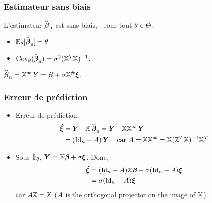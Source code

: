 \begin{frame}
\frametitle{Estimateur sans biais}
\begin{theo}
L'estimateur $\operatorname{\widehat{\boldsymbol{\beta}}_n}$ est sans biais, \ie\ pour tout $\theta \in \Theta$,
\begin{itemize}
\item $\operatorname{{\mathbb E}}_{\theta}[\operatorname{\widehat{\boldsymbol{\beta}}_n}]= \theta$
\item $\mathrm{Cov}_{\theta}(\operatorname{\widehat{\boldsymbol{\beta}}_n})= \sigma^2 (\mathbb{X}^T \mathbb{X})^{-1}$.
\end{itemize}
\end{theo}
\centerline{\alert{$\operatorname{\widehat{\boldsymbol{\beta}}_n} = \mathbb{X}^{\#} \operatorname{\boldsymbol{Y}}= \boldsymbol{\beta} + \sigma \mathbb{X}^{\#} \boldsymbol{\xi}$.}}
\end{frame}

\begin{frame}
\frametitle{Erreur de prédiction}
\begin{itemize}
\item \alert{Erreur de prédiction}:
\begin{align*}
\boldsymbol{\hat{\xi}}
&= \operatorname{\boldsymbol{Y}} - \mathbb{X} \operatorname{\widehat{\boldsymbol{\beta}}_n}= \operatorname{\boldsymbol{Y}} - \mathbb{X} \mathbb{X}^{\#} \operatorname{\boldsymbol{Y}} \\
&= (\mathrm{Id}_{n} - A) \operatorname{\boldsymbol{Y}} \quad \text{car $A = \mathbb{X} \mathbb{X}^{\#}= \mathbb{X} (\mathbb{X}^T \mathbb{X})^{-1} \mathbb{X}^T$}
\end{align*}
\item Sous $\operatorname{{\mathbb P}}_\theta$, $\operatorname{\boldsymbol{Y}}= \mathbb{X} \boldsymbol{\beta} +  \sigma \boldsymbol{\xi}$. Donc,
\begin{align*}
\boldsymbol{\hat{\xi}} &= (\mathrm{Id}_{n}-A) \mathbb{X} \boldsymbol{\beta} + \sigma (\mathrm{Id}_{n}-A)  \boldsymbol{\xi} \\
         &= \sigma (\mathrm{Id}_{n}-A) \boldsymbol{\xi}
\end{align*}
car $A \mathbb{X}= \mathbb{X}$ ($A$ is the orthogonal projector on the image of $\mathbb{X}$).
\end{itemize}
\end{frame}


